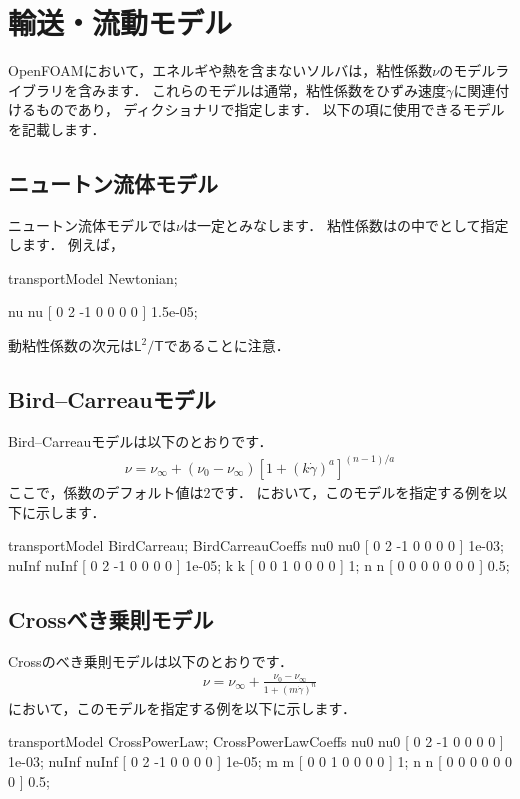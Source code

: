\section{輸送・流動モデル}
\label{sec:7.3@3.0.1}
OpenFOAMにおいて，エネルギや熱を含まないソルバは，粘性係数$\nu$のモデルライブラリを含みます．
これらのモデルは通常，粘性係数をひずみ速度$\dot{\gamma}$に関連付けるものであり，
ディクショナリで指定します．
以下の項に使用できるモデルを記載します．


\subsection{ニュートン流体モデル}
\label{ssec:7.3.1@3.0.1}
ニュートン流体モデルでは$\nu$は一定とみなします．
粘性係数はの中でとして指定します．
例えば，
\begin{OFverbatim}[file]
transportModel Newtonian;

nu             nu [ 0 2 -1 0 0 0 0 ] 1.5e-05;
\end{OFverbatim}
動粘性係数の次元は$\mathsf{L}^{2}/\mathsf{T}$であることに注意．


\subsection{Bird--Carreauモデル}
\label{ssec:7.3.2@3.0.1}
Bird--Carreauモデルは以下のとおりです．
\begin{align}
 \label{eq:7.14@3.0.1}
 \nu = \nu_{\infty} + (\nu_{0} - \nu_{\infty})[1 + (k\dot{\gamma})^{a}]^{(n-1)/a}
\end{align}
ここで，係数のデフォルト値は2です．
において，このモデルを指定する例を以下に示します．
\begin{OFverbatim}[file]
transportModel BirdCarreau;
BirdCarreauCoeffs
{
    nu0             nu0   [ 0 2 -1 0 0 0 0 ] 1e-03;
    nuInf           nuInf [ 0 2 -1 0 0 0 0 ] 1e-05;
    k               k     [ 0 0  1 0 0 0 0 ] 1;
    n               n     [ 0 0  0 0 0 0 0 ] 0.5;
}
\end{OFverbatim}


\subsection{Crossべき乗則モデル}
\label{ssec:7.3.3@3.0.1}
Crossのべき乗則モデルは以下のとおりです．
\begin{align}
 \label{eq:7.15@3.0.1}
 \nu = \nu_{\infty} + \frac{\nu_{0} - \nu_{\infty}}{1 + (m\dot{\gamma})^{n}}
\end{align}
において，このモデルを指定する例を以下に示します．
\begin{OFverbatim}[file]
transportModel CrossPowerLaw;
CrossPowerLawCoeffs
{
    nu0             nu0   [ 0 2 -1 0 0 0 0 ] 1e-03;
    nuInf           nuInf [ 0 2 -1 0 0 0 0 ] 1e-05;
    m               m     [ 0 0  1 0 0 0 0 ] 1;
    n               n     [ 0 0  0 0 0 0 0 ] 0.5;
}
\end{OFverbatim}


